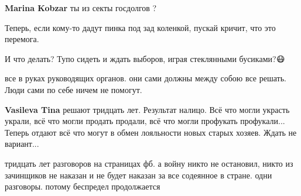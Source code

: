 \begin{itemize}
\begin{itemize}
\textbf{Marina Kobzar} ты из секты госдолгов ?
\end{itemize}

 
Теперь, если кому-то дадут пинка под зад коленкой, пускай кричит, что это перемога.

 
И что делать?
Тупо сидеть и ждать выборов, играя стеклянными бусиками?😷😤😤😤

\begin{itemize}
 
все в руках руководящих органов. они сами должны между собою все решать. Люди сами по себе ничем не помогут.

 
\textbf{Vasileva Tina} решают тридцать лет.
Результат налицо.
Всё что могли украсть украли, всё что могли продать продали, всё что могли профукать профукали...
Теперь отдают всё что могут в обмен лояльности новых старых хозяев.
Ждать не вариант...

 

тридцать лет разговоров на страницах фб. а войну никто не остановил, никто из
зачинщиков не наказан и не будет наказан за все содеянное в стране. одни
разговоры. потому беспредел продолжается


\end{itemize}
\end{itemize}
